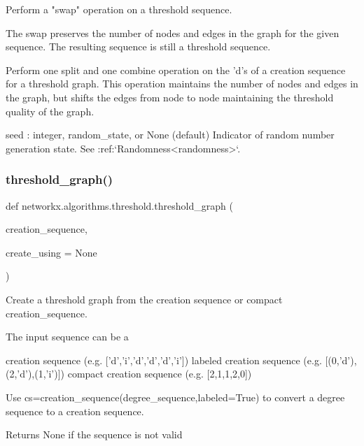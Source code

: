 \begin{DoxyVerb}Perform a "swap" operation on a threshold sequence.

The swap preserves the number of nodes and edges
in the graph for the given sequence.
The resulting sequence is still a threshold sequence.

Perform one split and one combine operation on the
'd's of a creation sequence for a threshold graph.
This operation maintains the number of nodes and edges
in the graph, but shifts the edges from node to node
maintaining the threshold quality of the graph.

seed : integer, random_state, or None (default)
    Indicator of random number generation state.
    See :ref:`Randomness<randomness>`.
\end{DoxyVerb}
 \mbox{\label{namespacenetworkx_1_1algorithms_1_1threshold_a3bd194f5a5c9317341cb7ef3bbe7568d}} 
\subsubsection{\texorpdfstring{threshold\+\_\+graph()}{threshold\_graph()}}
{\footnotesize\ttfamily def networkx.\+algorithms.\+threshold.\+threshold\+\_\+graph (\begin{DoxyParamCaption}\item[{}]{creation\+\_\+sequence,  }\item[{}]{create\+\_\+using = {\ttfamily None} }\end{DoxyParamCaption})}

\begin{DoxyVerb}Create a threshold graph from the creation sequence or compact
creation_sequence.

The input sequence can be a

creation sequence (e.g. ['d','i','d','d','d','i'])
labeled creation sequence (e.g. [(0,'d'),(2,'d'),(1,'i')])
compact creation sequence (e.g. [2,1,1,2,0])

Use cs=creation_sequence(degree_sequence,labeled=True)
to convert a degree sequence to a creation sequence.

Returns None if the sequence is not valid
\end{DoxyVerb}
 \mbox{\label{namespacenetworkx_1_1algorithms_1_1threshold_a1975d0019a04b726395579fa70d3e6e8}} 
